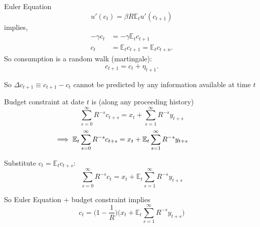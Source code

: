 \documentclass[11pt, aspectratio=169]{beamer}
\newenvironment{witemize}{\itemize\addtolength{\itemsep}{10pt}}{\enditemize}
\begin{document}
\begin{frame}{}

\begin{witemize}
\item Euler Equation 
\begin{equation*}
	u'(c_t) = \beta R \mathbb E_t u'(c_{t+1}) 
\end{equation*}
implies, 
\begin{align*}
	- \gamma c_t &= -\gamma \mathbb E_t c_{t+1} \\
	c_t &= \mathbb E_t c_{t+1} = \mathbb E_t c_{t+n}.
\end{align*}
So consumption is a random walk (martingale): 
\begin{equation*}
	c_{t+1} = c_t + \eta_{t+1}. 
\end{equation*}

\item So $\Delta c_{t+1} \equiv c_{t+1} - c_t$ cannot be predicted by any information available
at time $t$
\end{witemize}

\end{frame}


\begin{frame}{}

\begin{witemize}
\item Budget constraint at date $t$ is (along any proceeding history)
\begin{equation*}
	\sum_{s=0}^\infty R^{-s} c_{t+s} = x_t + \sum_{s=1}^\infty R^{-s} y_{t+s} 
\end{equation*}
\begin{equation*}
	\hspace{-10mm} \implies \mathbb E_t \sum_{s=0}^\infty R^{-s} c_{t+s} = x_t + \mathbb E_t \sum_{s=1}^\infty R^{-s} y_{t+s} 
\end{equation*}

\item Substitute $c_t = \mathbb E_t c_{t+s}$:
\begin{equation*}
	\sum_{s=0}^\infty R^{-s} c_t = x_t + \mathbb E_t \sum_{s=1}^\infty R^{-s} y_{t+s}
\end{equation*}

\item So Euler Equation + budget constraint implies 
\begin{equation*}
	c_t = \bigg(1-\frac{1}{R}\bigg) \bigg(x_t + \mathbb E_t \sum_{s=1}^\infty
R^{-s} y_{t+s} \bigg) 
\end{equation*}

\end{witemize}
\end{frame}
\end{document}
